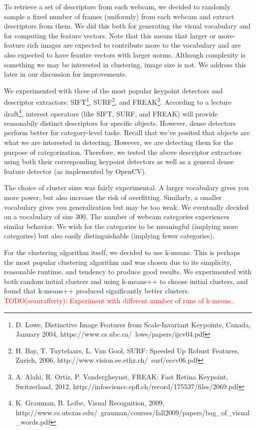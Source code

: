 \documentclass{article}
\begin{document}
To retrieve a set of descriptors from each webcam, we decided to randomly
sample a fixed number of frames (uniformly) from each webcam and extract
descriptors from them. We did this both for generating the visual vocabulary
and for computing the feature vectors. Note that this means that larger or
more-feature rich images are expected to contribute more to the vocabulary and
are also expected to have feautre vectors with larger norms. Although
complexity is something we may be interested in clustering, image size is not.
We address this later in our discussion for improvements.

We experimented with three of the most popular keypoint detectors and
descriptor extractors: SIFT\footnote{D. Lowe, Distinctive Image Features from
  Scale-Invariant Keypoints, Canada, January 2004,
  https://www.cs.ubc.ca/~lowe/papers/ijcv04.pdf}, SURF\footnote{H. Bay, T.
  Tuytelaars, L. Van Gool, SURF: Speeded Up Robust Features,  Zurich, 2006,
  http://www.vision.ee.ethz.ch/~surf/eccv06.pdf}, and FREAK\footnote{A. Alahi,
  R. Ortiz, P. Vandergheynst, FREAK: Fast Retina Keypoint, Switzerland, 2012,
http://infoscience.epfl.ch/record/175537/files/2069.pdf}. According to a
lecture draft\footnote{K. Grauman, B. Leibe, Visual Recognition, 2009,
http://www.cs.utexas.edu/~grauman/courses/fall2009/papers/bag\_of\_visual\_words.pdf},
interest operators (like SIFT, SURF, and FREAK) will provide reasonabily
distinct descriptors for specific objects. However, dense detectors perform
better for category-level tasks. Recall that we've posited that objects are
what we are interested in detecting. However, we are detecting them for the
purpose of categorization. Therefore, we tested the above descriptor extractors
using both their corresponding keypoint detectors as well as a general dense
feature detector (as implemented by OpenCV).

The choice of cluster sizes was fairly experimental. A larger vocabulary gives
you more power, but also increase the risk of overfitting. Similarly, a smaller
vocabulary gives you generalization but may be too weak. We eventually decided
on a vocabulary of size $300$. The number of webcam categories experiences
similar behavior. We wish for the categories to be meaningful (implying more
categories) but also easily distinguishable (implying fewer categories).


For the clustering algorithm itself, we decided to use k-means. This is perhaps
the most popular clustering algorithm and was chosen due to its simplicity,
reasonable runtime, and tendency to produce good results. We experimented with
both random initial clusters and using k-means++ to choose initial clusters,
and found that k-means++ produced significantly better clusters.
\textcolor{red}{TODO(seanrafferty): Experiment with different number of runs of
k-means.}.
\end{document}
